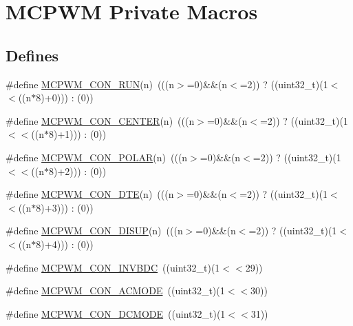 \hypertarget{group___m_c_p_w_m___private___macros}{\section{\-M\-C\-P\-W\-M \-Private \-Macros}
\label{group___m_c_p_w_m___private___macros}
}
\subsection*{\-Defines}
\begin{DoxyCompactItemize}
\item 
\#define \hyperlink{group___m_c_p_w_m___private___macros_gac3e50a27b6f7979b7b8fdd3526738910}{\-M\-C\-P\-W\-M\-\_\-\-C\-O\-N\-\_\-\-R\-U\-N}(n)~(((n$>$=0)\&\&(n$<$=2)) ? ((uint32\-\_\-t)(1$<$$<$((n$\ast$8)+0))) \-: (0))
\item 
\#define \hyperlink{group___m_c_p_w_m___private___macros_ga74e666543a14b180eaca82009eb2abb6}{\-M\-C\-P\-W\-M\-\_\-\-C\-O\-N\-\_\-\-C\-E\-N\-T\-E\-R}(n)~(((n$>$=0)\&\&(n$<$=2)) ? ((uint32\-\_\-t)(1$<$$<$((n$\ast$8)+1))) \-: (0))
\item 
\#define \hyperlink{group___m_c_p_w_m___private___macros_gaa654b0d075b126c9f7f9f297224ea84e}{\-M\-C\-P\-W\-M\-\_\-\-C\-O\-N\-\_\-\-P\-O\-L\-A\-R}(n)~(((n$>$=0)\&\&(n$<$=2)) ? ((uint32\-\_\-t)(1$<$$<$((n$\ast$8)+2))) \-: (0))
\item 
\#define \hyperlink{group___m_c_p_w_m___private___macros_ga2c6a39ac50ede2d4e8a4fb51d3cff645}{\-M\-C\-P\-W\-M\-\_\-\-C\-O\-N\-\_\-\-D\-T\-E}(n)~(((n$>$=0)\&\&(n$<$=2)) ? ((uint32\-\_\-t)(1$<$$<$((n$\ast$8)+3))) \-: (0))
\item 
\#define \hyperlink{group___m_c_p_w_m___private___macros_gaa5a7de7ff73a6163ef34e989953099d3}{\-M\-C\-P\-W\-M\-\_\-\-C\-O\-N\-\_\-\-D\-I\-S\-U\-P}(n)~(((n$>$=0)\&\&(n$<$=2)) ? ((uint32\-\_\-t)(1$<$$<$((n$\ast$8)+4))) \-: (0))
\item 
\#define \hyperlink{group___m_c_p_w_m___private___macros_gaccc8fe595f88cd2312d760c9335fd938}{\-M\-C\-P\-W\-M\-\_\-\-C\-O\-N\-\_\-\-I\-N\-V\-B\-D\-C}~((uint32\-\_\-t)(1$<$$<$29))
\item 
\#define \hyperlink{group___m_c_p_w_m___private___macros_ga368aaa99fbfdafbacfc4b3bb480789ac}{\-M\-C\-P\-W\-M\-\_\-\-C\-O\-N\-\_\-\-A\-C\-M\-O\-D\-E}~((uint32\-\_\-t)(1$<$$<$30))
\item 
\#define \hyperlink{group___m_c_p_w_m___private___macros_ga7969d577498619fec26b84f19a9a5453}{\-M\-C\-P\-W\-M\-\_\-\-C\-O\-N\-\_\-\-D\-C\-M\-O\-D\-E}~((uint32\-\_\-t)(1$<$$<$31))

\end{DoxyCompactItemize}
